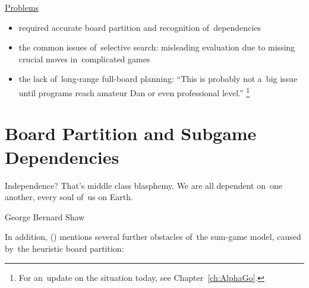 \underline{Problems}
\begin{itemize}[-]
  \item required accurate board partition and recognition of~dependencies
  \item the common issues of~selective search:
    misleading evaluation due to missing crucial moves in~complicated games
  \item the lack of~long-range full-board planning:
    ``This is probably not a~big issue until programs reach amateur Dan or even professional level.''%
    \footnote{For an~update on the situation today, see Chapter~\ref{ch:AlphaGo}.}
\end{itemize}

\section{Board Partition and Subgame Dependencies}
\epigraph{
  Independence?
  That's middle class blasphemy.
  We are all dependent on~one another, every soul of~us on Earth. 
}{George Bernard Shaw}
In addition, (\cite{Muller1995computer}) mentions several further obstacles of~the sum-game model, caused by~the heuristic board partition:

